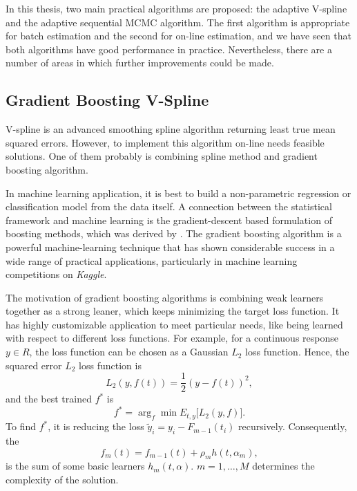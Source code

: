 
In this thesis, two main practical algorithms are proposed: the adaptive V-spline and the adaptive sequential MCMC algorithm. The first algorithm is appropriate for batch estimation and the second for on-line estimation, and we have seen that both algorithms have good performance in practice. Nevertheless, there are a number of areas in which further improvements could be made.


\subsection*{Gradient Boosting V-Spline}

V-spline is an advanced smoothing spline algorithm returning least true mean squared errors. However, to implement this algorithm on-line needs feasible solutions. One of them probably is combining spline method and gradient boosting algorithm. 


In machine learning application, it is best to build a non-parametric regression or classification model from the data itself. A connection between the statistical framework and machine learning is the gradient-descent based formulation of boosting methods, which was derived by \cite{freund1995desicion, friedman2001greedy}. The gradient boosting algorithm is a powerful machine-learning technique that has shown considerable success in a wide range of practical applications, particularly in machine learning competitions on \textit{Kaggle}. 


The motivation of gradient boosting algorithms is combining weak learners together as a strong leaner, which keeps minimizing the target loss function. 
It has highly customizable application to meet particular needs, like being learned with respect to different loss functions. For example, for a continuous response $y\in \mathit{R}$, the loss function can be chosen as a Gaussian $L_2$ loss function. Hence, the squared error $L_2$ loss function is 
\begin{equation}
L_2(y,f(t)) = \frac{1}{2}\left(y-f(t)\right)^2,
\end{equation}
and the best trained $f^*$ is 
\begin{equation}
f^* = \arg_{f}\min E_{t,y}\lbrack L_2\left(y,f\right)\rbrack.
\end{equation}
To find $f^*$, it is reducing the loss $\tilde{y}_i=y_i-F_{m-1}(t_i)$ recursively. Consequently, the 
\begin{equation}
f_m(t) = f_{m-1}(t)+ \rho_mh(t,\alpha_m),
\end{equation}
is the sum of some basic learners $h_m(t,\alpha)$. $m=1,\ldots,M$ determines the complexity of the solution. 


